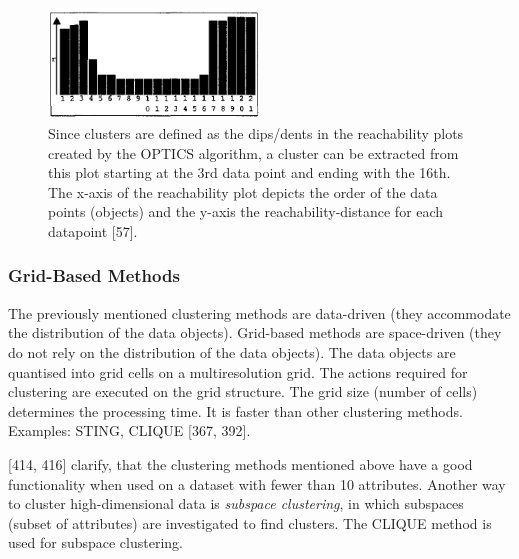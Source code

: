 \begin{figure}
  \centering
  \includegraphics[width=0.5\textwidth]{./images/clusterExtractionOPTICS.png}
  \caption{Since clusters are defined as the dips/dents in the reachability plots created by the OPTICS algorithm, a cluster can be extracted from this plot starting at the 3rd data point and ending with the 16th. The x-axis of the reachability plot depicts the order of the data points (objects) and the y-axis the reachability-distance for each datapoint \autocite{OPTICS}[57].}
  \label{figure:clusterExtractionOPTICS}
\end{figure}


 

  \subsubsection{Grid-Based Methods}
  The previously mentioned clustering methods are data-driven (they accommodate the distribution of the data objects). Grid-based methods are space-driven (they do not rely on the distribution of the data objects). The data objects are quantised into grid cells on a multiresolution grid. The actions required for clustering are executed on the grid structure. The grid size (number of cells) determines the processing time. It is faster than other clustering methods. Examples: STING, CLIQUE \autocite{han2011data}[367, 392].
  
  

  \vspace{5mm} %
\textcite{han2011data}[414, 416] clarify, that the clustering methods mentioned above have a good functionality when used on a dataset with fewer than 10 attributes. Another way to cluster high-dimensional data is \textit{subspace clustering}, in which subspaces (subset of attributes) are investigated to find clusters. The CLIQUE method is used for subspace clustering. 

